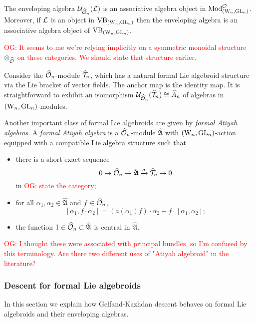 \documentclass[10pt]{amsart}
\def\owen{\textcolor{red}{OG: }\textcolor{red}}
\def\hA{\Hat{A}}
\def\cU{\mathcal{U}}
\begin{document}
\begin{lemma} The enveloping algebra $\cU_{\hO_n} (\cL)$ is an
  associative algebra
  object in $\Mod_{(\Vect, \GL_n)}^{\cO}$. Moreover, if $\cL$
  is an object in $\VB_{(\Vect, \GL_n)}$ then the enveloping algebra
  is an associative algebra object of $\VB_{(\Vect, \GL_n)}$. 
\end{lemma}

\owen{It seems to me we're relying implicitly on a symmetric monoidal structure $\otimes_{\hO}$ on these categories. We should state that structure earlier.}

\begin{ex} 
Consider the $\hO_n$-module  $\hT_n$, which has a natural formal Lie
  algebroid structure via the Lie bracket of vector
  fields. The anchor map is the identity map. It is straightforward to exhibit
  an isomorphism $\cU_{\hO_n} (\hT_n) \cong \hA_n$ of algebras in $(\Vect, \GL_n)$-modules.
\end{ex}

\begin{ex} 
Another important class of formal Lie algebroids are given by {\it formal Atiyah algebras}.  A {\it formal Atiyah algebra} is a $\hO_n$-module $\hat{\mathfrak{A}}$ with $(\Vect, \GL_n)$-action equipped with a compatible Lie algebra structure such that
\begin{itemize}
\item[(i)] there is a short exact sequence 
\[
0 \to \hO_n \to \hat{\mathfrak{A}} \xrightarrow{a} \hT_n \to 0
\]
in \owen{state the category};
\item[(ii)] for all $\alpha_1, \alpha_2 \in \hat{\mathfrak{A}}$ and $f \in \hO_n$,
\[ [\alpha_1 , f \cdot \alpha_2 ] = (a (\alpha_1) f) \cdot \alpha_2 + f \cdot [\alpha_1 , \alpha_2]; 
\]
\item[(iii)] the function $1 \in \hO_n \subset \hat{\mathfrak{A}}$ is central in $\hat{\mathfrak{A}}$.
\end{itemize}
\end{ex}

\owen{I thought these were associated with principal bundles, so I'm confused by this terminology. Are there two different uses of "Atiyah algebroid" in the literature?}

\subsubsection{Descent for formal Lie algebroids}
In this section we explain how Gelfand-Kazhdan descent behaves on formal Lie algebroids and their enveloping algebras.
\end{document}
